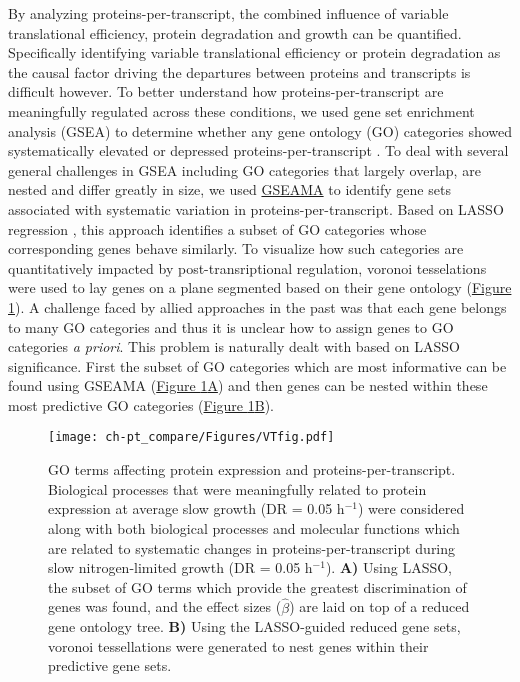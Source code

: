 By analyzing proteins-per-transcript, the combined influence of variable translational efficiency, protein degradation and growth can be quantified. Specifically identifying variable translational efficiency or protein degradation as the causal factor driving the departures between proteins and transcripts is difficult however. To better understand how proteins-per-transcript are meaningfully regulated across these conditions, we used gene set enrichment analysis (GSEA) to determine whether any gene ontology (GO) categories showed systematically elevated or depressed proteins-per-transcript \cite{Subramanian:2005jt}. To deal with several general challenges in GSEA including GO categories that largely overlap, are nested and differ greatly in size, we used \href{https://github.com/dgrtwo/GSEAMA}{GSEAMA} to identify gene sets associated with systematic variation in proteins-per-transcript. Based on LASSO regression \cite{Tibshirani:1996wb}, this approach identifies a subset of GO categories whose corresponding genes behave similarly. To visualize how such categories are quantitatively impacted by post-transriptional regulation, voronoi tesselations \cite{Aurenhammer:1991ca} were used to lay genes on a plane segmented based on their gene ontology (\hyperref[voronoiFig]{Figure \ref{voronoiFig}}). A challenge faced by allied approaches in the past \cite{Halligan:2007ds, Otto:2010br} was that each gene belongs to many GO categories and thus it is unclear how to assign genes to GO categories \textit{a priori}. This problem is naturally dealt with based on LASSO significance. First the subset of GO categories which are most informative can be found using GSEAMA (\hyperref[voronoiFig]{Figure \ref{voronoiFig}A}) and then genes can be nested within these most predictive GO categories (\hyperref[voronoiFig]{Figure \ref{voronoiFig}B}).

\begin{figure}[hbtp]
\begin{center}
\texttt{[image: ch-pt\_compare/Figures/VTfig.pdf]}
\end{center}
\caption[GO terms affecting protein expression and proteins-per-transcript]{GO terms affecting protein expression and proteins-per-transcript. Biological processes that were meaningfully related to protein expression at average slow growth (DR = 0.05 h$^{-1}$) were considered along with both biological processes and molecular functions which are related to systematic changes in proteins-per-transcript during slow nitrogen-limited growth (DR = 0.05 h$^{-1}$). \textbf{A)} Using LASSO, the subset of GO terms which provide the greatest discrimination of genes was found, and the effect sizes ($\hat{\beta}$) are laid on top of a reduced gene ontology tree. \textbf{B)} Using the LASSO-guided reduced gene sets, voronoi tessellations were generated to nest genes within their predictive gene sets.}
\label{voronoiFig}
\end{figure}


